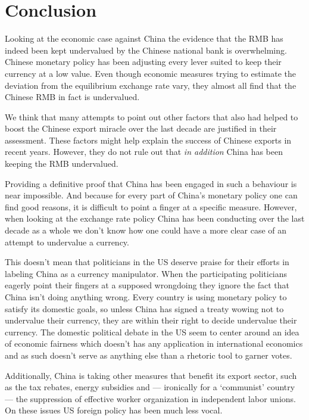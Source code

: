 \section{Conclusion}
\label{sec:conclusion}

Looking at the economic case against China the evidence that the RMB has 
indeed been kept undervalued by the Chinese national bank is 
overwhelming. Chinese monetary policy has been adjusting every lever suited to keep their currency at a low value.  Even though 
economic measures trying to estimate the deviation from the equilibrium exchange rate vary, they almost 
all find that the Chinese RMB in fact is undervalued.

We think that many attempts to point out other factors that also had helped to boost the Chinese 
export miracle over the last decade are justified in their 
assessment. These factors might help explain the success of 
Chinese exports in recent years. However, they do not rule out that \emph{in addition} China has been keeping the RMB undervalued.

Providing a definitive proof that China has been engaged in such a 
behaviour is near impossible. And because for every part of China's monetary policy one can find good reasons, it is difficult to point a finger at a specific measure. However, when looking at the exchange rate policy 
China has been conducting over the last decade as a whole we don't know 
how one could have a more clear case of an attempt to undervalue a currency.

This doesn't mean that politicians in the US deserve praise for their 
efforts in labeling China as a currency manipulator. When the 
participating politicians eagerly point their fingers at a supposed 
wrongdoing they ignore the fact that China isn't doing anything wrong.
Every country is using monetary policy to satisfy its domestic goals, so
unless China has signed a treaty wowing not to undervalue their 
currency, they are within their right to decide undervalue their 
currency. The domestic political debate in the US seem to center around 
an idea of economic fairness which doesn't has any application in 
international economics and as such doesn't serve as anything else than 
a rhetoric tool to garner votes.

Additionally, China is taking other measures that benefit its export 
sector, such as the tax rebates, energy subsidies and --- ironically for 
a `communist' country --- the suppression of effective worker 
organization in independent labor unions. On these issues US foreign 
policy has been much less vocal. 

